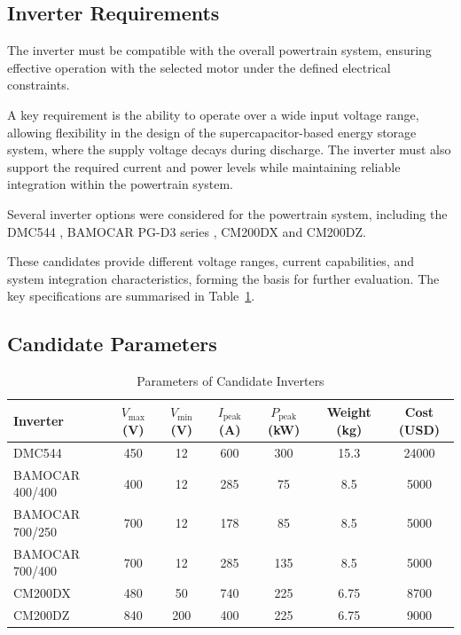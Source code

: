 \documentclass[11pt, a4paper]{report}
\numberwithin{equation}{section}
\begin{document}
\begin{refsection}
\subsection{Inverter Requirements}

The inverter must be compatible with the overall powertrain system, ensuring effective operation with the selected motor under the defined electrical constraints.

A key requirement is the ability to operate over a wide input voltage range, allowing flexibility in the design of the supercapacitor-based energy storage system, where the supply voltage decays during discharge.
The inverter must also support the required current and power levels while maintaining reliable integration within the powertrain system.

Several inverter options were considered for the powertrain system, including the DMC544\cite{DMC544_datasheet}
, BAMOCAR PG-D3 series\cite{BAMOCAR_data_sheet}
, CM200DX and CM200DZ\cite{CM200_data_sheet}.

These candidates provide different voltage ranges, current capabilities, and system integration characteristics, forming the basis for further evaluation. The key specifications are summarised in Table~\ref{tab:inverter_parameters}.

\subsection{Candidate Parameters}

\begin{table}[H]
\centering
\renewcommand{\arraystretch}{1}
\caption{Parameters of Candidate Inverters}
\label{tab:inverter_parameters}
\begin{tabular}{lcccccc}
\toprule
Inverter & $V_{\text{max}}$ (V) & $V_{\text{min}}$ (V) & $I_{\text{peak}}$ (A) & $P_{\text{peak}}$ (kW) & Weight (kg) & Cost (USD) \\
\midrule
DMC544 & 450 & 12 & 600 & 300 & 15.3 & 24000 \\
BAMOCAR 400/400 & 400 & 12 & 285 & 75 & 8.5 & 5000 \\
BAMOCAR 700/250 & 700 & 12 & 178 & 85 & 8.5 & 5000 \\
BAMOCAR 700/400 & 700 & 12 & 285 & 135 & 8.5 & 5000 \\
CM200DX & 480 & 50 & 740 & 225 & 6.75 & 8700 \\
CM200DZ & 840 & 200 & 400 & 225 & 6.75 & 9000 \\
\bottomrule
\end{tabular}
\end{table}


\end{refsection}
\end{document}
